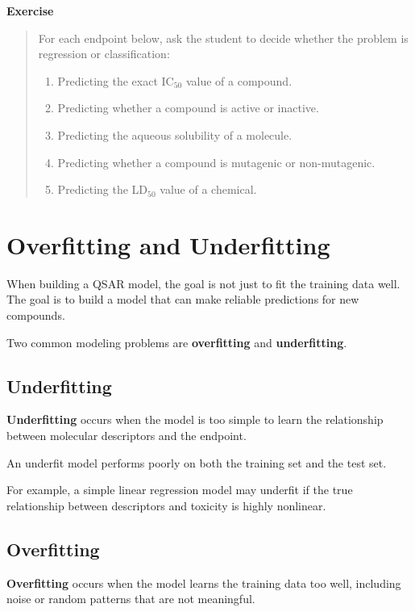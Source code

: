 \documentclass[11pt]{report}
\newenvironment{Important note}{\begin{quote}\color{red}\textbf{Important note:} }{\end{quote}}
\newenvironment{exercise}
{\vspace{0.5em}\noindent\textbf{Exercise}\begin{quote}}
{\end{quote}\vspace{0.5em}}
\begin{document}
\begin{exercise}
For each endpoint below, ask the student to decide whether the problem is regression or classification:

\begin{enumerate}[leftmargin=*]
    \item Predicting the exact IC$_{50}$ value of a compound.
    \item Predicting whether a compound is active or inactive.
    \item Predicting the aqueous solubility of a molecule.
    \item Predicting whether a compound is mutagenic or non-mutagenic.
    \item Predicting the LD$_{50}$ value of a chemical.
\end{enumerate}
\end{exercise}

\section{Overfitting and Underfitting}

When building a QSAR model, the goal is not just to fit the training data well. The goal is to build a model that can make reliable predictions for new compounds.

Two common modeling problems are \textbf{overfitting} and \textbf{underfitting}.

\subsection{Underfitting}

\textbf{Underfitting} occurs when the model is too simple to learn the relationship between molecular descriptors and the endpoint.

An underfit model performs poorly on both the training set and the test set.

For example, a simple linear regression model may underfit if the true relationship between descriptors and toxicity is highly nonlinear.

\subsection{Overfitting}

\textbf{Overfitting} occurs when the model learns the training data too well, including noise or random patterns that are not meaningful.
\end{document}
